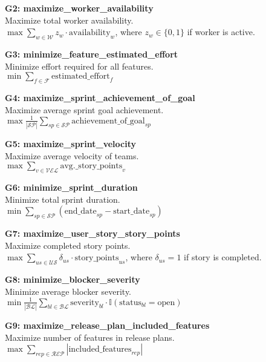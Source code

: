 \documentclass[12pt]{article}
\begin{document}
    \item \textbf{G2: maximize\_worker\_availability} \\
    Maximize total worker availability. \\
    $ \max \sum_{w \in \mathcal{W}} z_w \cdot \text{availability}_w $, where $ z_w \in \{0,1\} $ if worker is active.

    \item \textbf{G3: minimize\_feature\_estimated\_effort} \\
    Minimize effort required for all features. \\
    $ \min \sum_{f \in \mathcal{F}} \text{estimated\_effort}_f $

    \item \textbf{G4: maximize\_sprint\_achievement\_of\_goal} \\
    Maximize average sprint goal achievement. \\
    $ \max \frac{1}{|\mathcal{SP}|} \sum_{sp \in \mathcal{SP}} \text{achievement\_of\_goal}_{sp} $

    \item \textbf{G5: maximize\_sprint\_velocity} \\
    Maximize average velocity of teams. \\
    $ \max \sum_{v \in \mathcal{VEL}} \text{avg.\_story\_points}_v $

    \item \textbf{G6: minimize\_sprint\_duration} \\
    Minimize total sprint duration. \\
    $ \min \sum_{sp \in \mathcal{SP}} (\text{end\_date}_{sp} - \text{start\_date}_{sp}) $

    \item \textbf{G7: maximize\_user\_story\_story\_points} \\
    Maximize completed story points. \\
    $ \max \sum_{us \in \mathcal{US}} \delta_{us} \cdot \text{story\_points}_{us} $, where $ \delta_{us} = 1 $ if story is completed.

    \item \textbf{G8: minimize\_blocker\_severity} \\
    Minimize average blocker severity. \\
    $ \min \frac{1}{|\mathcal{BL}|} \sum_{bl \in \mathcal{BL}} \text{severity}_{bl} \cdot \mathbb{I}(\text{status}_{bl} = \text{open}) $

    \item \textbf{G9: maximize\_release\_plan\_included\_features} \\
    Maximize number of features in release plans. \\
    $ \max \sum_{rep \in \mathcal{REP}} |\text{included\_features}_{rep}| $
\end{document}
